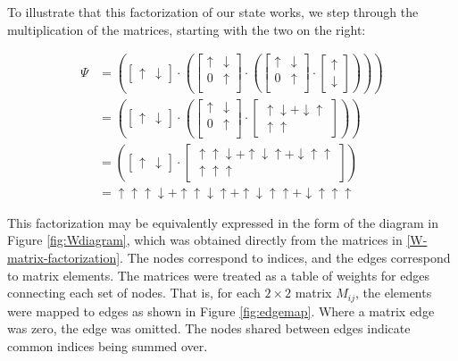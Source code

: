 \documentclass[12pt]{amsbook}
\theoremstyle{plain}
\theoremstyle{definition}
\theoremstyle{remark}
\newcommand{\bmat}[4]{
\begin{bmatrix}
#1 & #2\\
#3 & #4\\
\end{bmatrix}
}
\newcommand{\paren}[1]{\left(#1\right)}
\begin{document}
To illustrate that this factorization of our state works, we step through the multiplication of the matrices, starting with the two on the right:

$$
\begin{aligned}
  \Psi &= \paren{\begin{bmatrix}\uparrow & \downarrow \end{bmatrix}\cdot
          \paren{\bmat{\uparrow}{\downarrow}{0}{\uparrow}\cdot
          \paren{\bmat{\uparrow}{\downarrow}{0}{\uparrow}\cdot
          \begin{bmatrix}\uparrow \\ \downarrow \end{bmatrix}}}}\\
       &= \paren{\begin{bmatrix}\uparrow & \downarrow \end{bmatrix}\cdot
          \paren{\bmat{\uparrow}{\downarrow}{0}{\uparrow}\cdot
          \begin{bmatrix}\uparrow\downarrow+\downarrow\uparrow \\ \uparrow\uparrow \end{bmatrix}}}\\
       &= \paren{\begin{bmatrix}\uparrow & \downarrow \end{bmatrix}\cdot
          \begin{bmatrix}\uparrow\uparrow\downarrow+\uparrow\downarrow\uparrow+ \downarrow\uparrow\uparrow \\ \uparrow\uparrow\uparrow \end{bmatrix}}\\
       &= \uparrow\uparrow\uparrow\downarrow + \uparrow\uparrow\downarrow\uparrow + \uparrow\downarrow\uparrow\uparrow + \downarrow\uparrow\uparrow\uparrow
\end{aligned}
$$

This factorization may be equivalently expressed in the form of the diagram in Figure \ref{fig:Wdiagram}, which was obtained directly from the matrices in \eqref{W-matrix-factorization}.  The nodes correspond to indices, and the edges correspond to matrix elements.  The matrices were treated as a table of weights for edges connecting each set of nodes.  That is, for each $2\times 2$ matrix $M_{ij}$, the elements were mapped to edges as shown in Figure \ref{fig:edgemap}.  Where a matrix edge was zero, the edge was omitted.  The nodes shared between edges indicate common indices being summed over.
\end{document}
